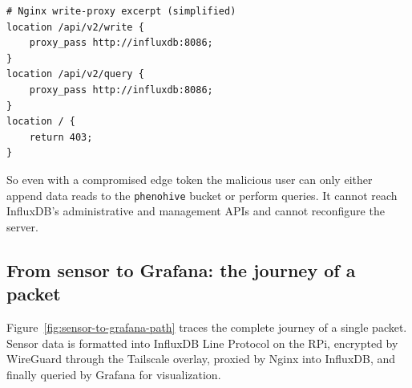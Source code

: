 \begin{verbatim}
# Nginx write-proxy excerpt (simplified)
location /api/v2/write {
    proxy_pass http://influxdb:8086;
}
location /api/v2/query {
    proxy_pass http://influxdb:8086;
}
location / {
    return 403;
}
\end{verbatim}

So even with a compromised edge token the malicious user can only either append data reads to the \texttt{phenohive} bucket or perform queries. It cannot reach InfluxDB's administrative and management APIs and cannot reconfigure the server. 

\subsection{From sensor to Grafana: the journey of a packet}

Figure~\ref{fig:sensor-to-grafana-path} traces the complete journey of a single packet. Sensor data is formatted into InfluxDB Line Protocol on the RPi, encrypted by WireGuard through the Tailscale overlay, proxied by Nginx into InfluxDB, and finally queried by Grafana for visualization.

